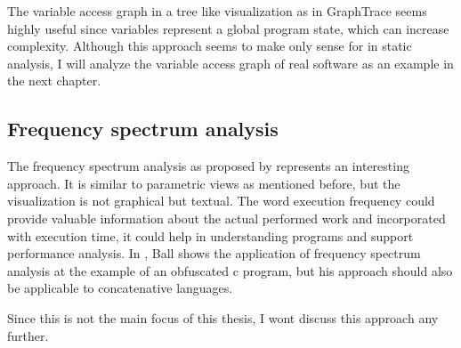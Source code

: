 The variable access graph in a tree like visualization as in GraphTrace seems highly useful since variables represent a global program state, which can increase complexity. Although this approach seems to make only sense for in static analysis, I will analyze the variable access graph of real software as an example in the next chapter.

\subsection*{Frequency spectrum analysis}

The frequency spectrum analysis as proposed by \cite{Ball:1999:CDA:318774.318944} represents an interesting approach. It is similar to parametric views as mentioned before, but the visualization is not graphical but textual. The word execution frequency could provide valuable information about the actual performed work and incorporated with execution time, it could help in understanding programs and support performance analysis. In \cite{Ball:1999:CDA:318774.318944}, Ball shows the application of frequency spectrum analysis at the example of an obfuscated c program, but his approach should also be applicable to concatenative languages.

Since this is not the main focus of this thesis, I wont discuss this approach any further.